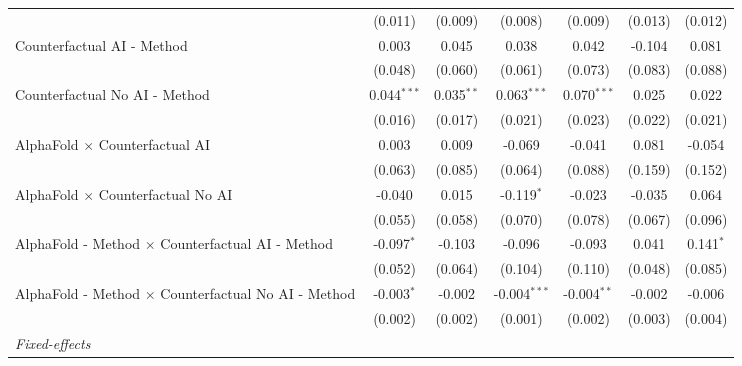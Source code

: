 \begin{tabular}{lcccccc}
                                                              & (0.011)       & (0.009)       & (0.008)        & (0.009)       & (0.013)       & (0.012)\\   
   Counterfactual AI - Method                                 & 0.003         & 0.045         & 0.038          & 0.042         & -0.104        & 0.081\\   
                                                              & (0.048)       & (0.060)       & (0.061)        & (0.073)       & (0.083)       & (0.088)\\   
   Counterfactual No AI - Method                              & 0.044$^{***}$ & 0.035$^{**}$  & 0.063$^{***}$  & 0.070$^{***}$ & 0.025         & 0.022\\   
                                                              & (0.016)       & (0.017)       & (0.021)        & (0.023)       & (0.022)       & (0.021)\\   
   AlphaFold $\times$ Counterfactual AI                       & 0.003         & 0.009         & -0.069         & -0.041        & 0.081         & -0.054\\   
                                                              & (0.063)       & (0.085)       & (0.064)        & (0.088)       & (0.159)       & (0.152)\\   
   AlphaFold $\times$ Counterfactual No AI                    & -0.040        & 0.015         & -0.119$^{*}$   & -0.023        & -0.035        & 0.064\\   
                                                              & (0.055)       & (0.058)       & (0.070)        & (0.078)       & (0.067)       & (0.096)\\   
   AlphaFold - Method $\times$ Counterfactual AI - Method     & -0.097$^{*}$  & -0.103        & -0.096         & -0.093        & 0.041         & 0.141$^{*}$\\   
                                                              & (0.052)       & (0.064)       & (0.104)        & (0.110)       & (0.048)       & (0.085)\\   
   AlphaFold - Method $\times$ Counterfactual No AI - Method  & -0.003$^{*}$  & -0.002        & -0.004$^{***}$ & -0.004$^{**}$ & -0.002        & -0.006\\   
                                                              & (0.002)       & (0.002)       & (0.001)        & (0.002)       & (0.003)       & (0.004)\\   
   \midrule
   \emph{Fixed-effects}\\

\end{tabular}
